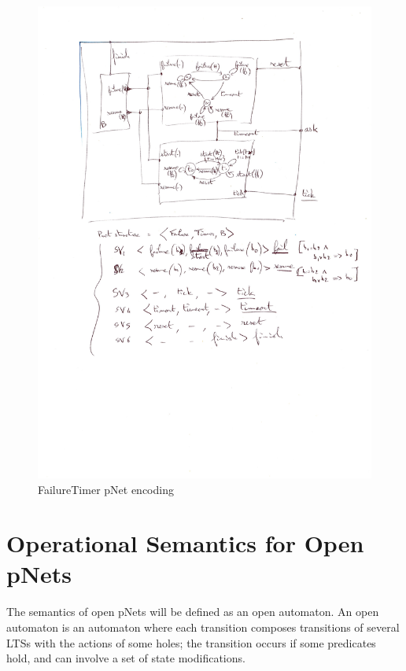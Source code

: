 \documentclass{lncs/llncs}
\begin{document}
\begin{figure}[t]
   \centerline{\includegraphics[width=12cm]{XFIG/BIPpnet-ArchFailureTimerMax}}
   \caption{FailureTimer pNet encoding}  \label{schema:BIParchitecture}
 \end{figure}



\section{Operational Semantics for Open pNets}
\label{section:op-semantics}

The semantics of open pNets will be defined  as an open automaton. An open
automaton is an automaton where each transition composes transitions
of several LTSs with the
actions of some holes; the transition occurs if some predicates hold,
and can involve a set of state modifications.
\end{document}
